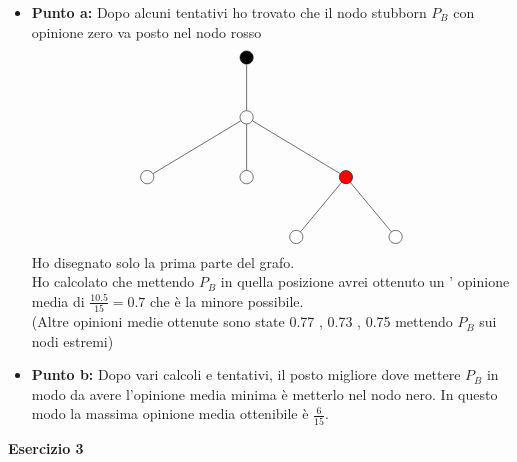 \documentclass[a4paper,12pt]{article}
\begin{document}
	\begin{itemize}
		\item \textbf{Punto a: }
		Dopo alcuni tentativi ho trovato che il nodo stubborn $P_B$ con opinione zero va posto nel nodo rosso\\
		\[
		\begin{tikzpicture}[level distance=1.5cm, sibling distance=2.5cm]
			\node[circle, draw, fill=black] {}
			child {node[circle, draw] {}
				child{node[circle, draw] {}}
				child {node[circle, draw] {}}
				child {node[circle, draw, fill=red] {}
					child {node[circle, draw] {}}
					child {node[circle, draw] {}}}}; %
			
		\end{tikzpicture}
		\]
		Ho disegnato solo la prima parte del grafo.\\
		Ho calcolato che mettendo $P_B$ in quella posizione avrei ottenuto un ' opinione media di $\frac{10.5}{15}=0.7$ che è la minore possibile.\\
		(Altre opinioni medie ottenute sono state 0.77 , 0.73 , 0.75 mettendo $P_B$ sui nodi estremi)
		\item \textbf{Punto b: }
		Dopo vari calcoli e tentativi, il posto migliore dove mettere $P_B$ in modo da avere l'opinione media minima è metterlo nel nodo nero. In questo modo la massima opinione media ottenibile è $\frac{6}{15}$.
	\end{itemize}
	\centering \textbf{Esercizio 3}\\
\end{document}
